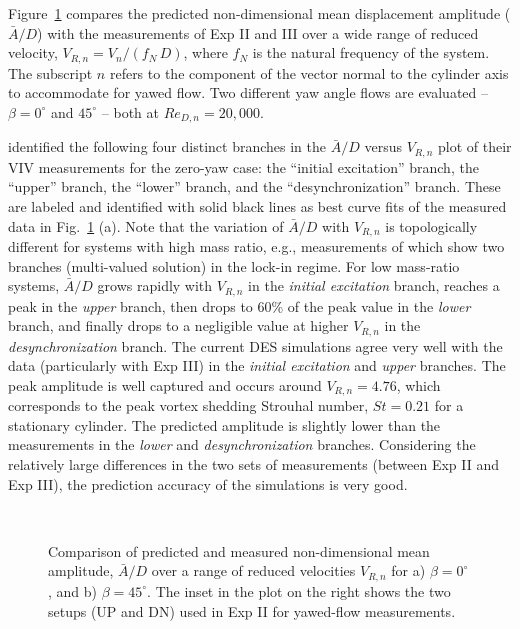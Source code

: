 Figure~\ref{fig:VIV_amp} compares the predicted non-dimensional mean
displacement amplitude ($\bar{A}/D$) with the measurements of Exp II and III
over a wide range of reduced velocity, $V_{R,n} = V_n/(f_N\,D)$, where $f_N$ is
the natural frequency of the system. The subscript $n$ refers to the component
of the vector normal to the cylinder axis to accommodate for yawed flow. Two
different yaw angle flows are evaluated -- $\beta=0^\circ$ and $45^\circ$ --
both at $Re_{D,n}=20,000$.

\citet{khalak1997fluid} identified the following four distinct branches in the
$\bar{A}/D$ versus $V_{R,n}$ plot of their VIV measurements for the zero-yaw
case: the ``initial excitation'' branch, the ``upper'' branch, the ``lower''
branch, and the ``desynchronization'' branch. These are labeled and identified
with solid black lines as best curve fits of the measured data in
Fig.~\ref{fig:VIV_amp} (a). Note that the variation of $\bar{A}/D$ with
$V_{R,n}$ is topologically different for systems with high mass ratio, e.g.,
measurements of \citet{feng1968measurement} which show two branches
(multi-valued solution) in the lock-in regime.  For low mass-ratio systems,
$\bar{A}/D$ grows rapidly with $V_{R,n}$ in the {\em initial excitation}
branch, reaches a peak in the {\em upper} branch, then drops to 60\% of the
peak value in the {\em lower} branch, and finally drops to a negligible value
at higher $V_{R,n}$ in the {\em desynchronization} branch. The current DES
simulations agree very well with the data (particularly with Exp III) in the
{\em initial excitation} and {\em upper} branches. The peak amplitude is well
captured and occurs around $V_{R,n}=4.76$, which corresponds to the peak vortex
shedding Strouhal number, $St=0.21$ for a stationary cylinder. The predicted
amplitude is slightly lower than the measurements in the {\em lower} and {\em
desynchronization} branches. Considering the relatively large differences in
the two sets of measurements (between Exp II and Exp III), the prediction
accuracy of the simulations is very good.
%
\begin{figure}[htb!]
  \centering
   {}
  \qquad
   \\
    \caption{Comparison of predicted and measured non-dimensional mean
      amplitude, $\bar{A}/D$ over a range of reduced velocities $V_{R,n}$ for
      a) $\beta=0^\circ$, and b) $\beta=45^\circ$. The inset in the plot on the
      right shows the two setups (UP and DN) used in Exp II for yawed-flow
      measurements.} 
  \label{fig:VIV_amp}
\end{figure}

